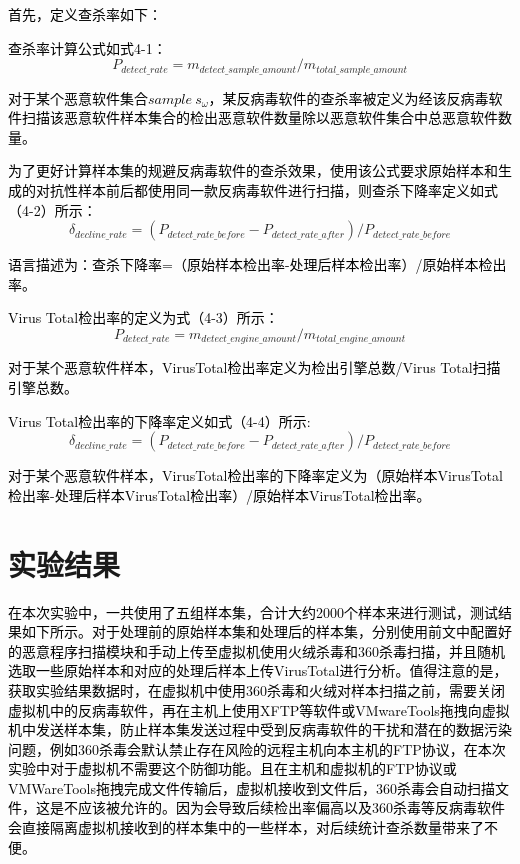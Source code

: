 \textcolor{black}{首先，定义查杀率如下：}

\textcolor{black}{查杀率计算公式如式4-1：}
\begin{equation}
P_{detect\_rate}=m_{detect\_sample\_amount}/m_{total\_sample\_amount}
\end{equation}

\textcolor{black}{对于某个恶意软件集合$sample\ s_{\omega}$，某反病毒软件的查杀率被定义为经该反病毒软件扫描该恶意软件样本集合的检出恶意软件数量除以恶意软件集合中总恶意软件数量。}

\textcolor{black}{为了更好计算样本集的规避反病毒软件的查杀效果，使用该公式要求原始样本和生成的对抗性样本前后都使用同一款反病毒软件进行扫描，则查杀下降率定义如式（4-2）所示：}
\begin{equation}
\delta_{decline\_rate}=(P_{detect\_rate\_before}-P_{detect\_rate\_after})/P_{detect\_rate\_before}
\end{equation}

\textcolor{black}{语言描述为：查杀下降率=（原始样本检出率-处理后样本检出率）/原始样本检出率。}

\textcolor{black}{Virus Total检出率的定义为式（4-3）所示： }
\begin{equation}
P_{detect\_rate}=m_{detect\_engine\_amount}/m_{total\_engine\_amount}
\end{equation}

\textcolor{black}{对于某个恶意软件样本，VirusTotal检出率定义为检出引擎总数/Virus Total扫描引擎总数。}

\textcolor{black}{Virus Total检出率的下降率定义如式（4-4）所示:}
\begin{equation}
    \delta_{decline\_rate}=(P_{detect\_rate\_before}-P_{detect\_rate\_after})/P_{detect\_rate\_before}
\end{equation}

\textcolor{black}{对于某个恶意软件样本，VirusTotal检出率的下降率定义为（原始样本VirusTotal检出率-处理后样本VirusTotal检出率）/原始样本VirusTotal检出率。}

\section{实验结果}

\textcolor{black}{在本次实验中，一共使用了五组样本集，合计大约2000个样本来进行测试，测试结果如下所示。对于处理前的原始样本集和处理后的样本集，分别使用前文中配置好的恶意程序扫描模块和手动上传至虚拟机使用火绒杀毒和360杀毒扫描，并且随机选取一些原始样本和对应的处理后样本上传VirusTotal进行分析。值得注意的是，获取实验结果数据时，在虚拟机中使用360杀毒和火绒对样本扫描之前，需要关闭虚拟机中的反病毒软件，再在主机上使用XFTP等软件或VMwareTools拖拽向虚拟机中发送样本集，防止样本集发送过程中受到反病毒软件的干扰和潜在的数据污染问题，例如360杀毒会默认禁止存在风险的远程主机向本主机的FTP协议，在本次实验中对于虚拟机不需要这个防御功能。且在主机和虚拟机的FTP协议或VMWareTools拖拽完成文件传输后，虚拟机接收到文件后，360杀毒会自动扫描文件，这是不应该被允许的。因为会导致后续检出率偏高以及360杀毒等反病毒软件会直接隔离虚拟机接收到的样本集中的一些样本，对后续统计查杀数量带来了不便。}

